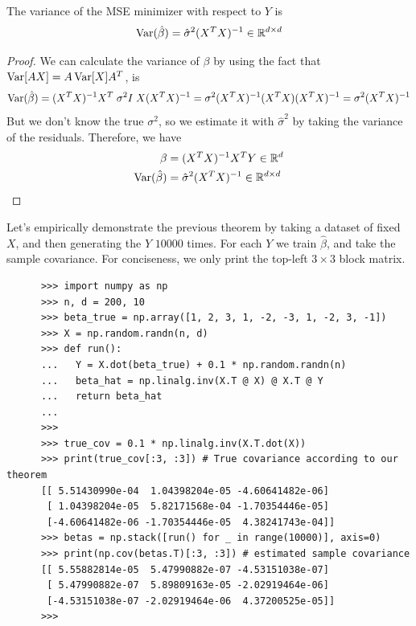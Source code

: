   \begin{corollary}
    The variance of the MSE minimizer with respect to $Y$ is 
    \begin{equation}
      \Var(\hat{\beta}) = \hat{\sigma}^2 (X^T X)^{-1} \in \mathbb{R}^{d \times d}
    \end{equation}
  \end{corollary}
  \begin{proof}
    We can calculate the variance of $\beta$ by using the fact that $\Var[A X] = A \Var[X] A^T$, is
    \begin{equation}
      \Var(\hat{\beta}) = (X^{T} X)^{-1} X^{T} \;\sigma^2 I \; X  (X^{T} X)^{-1} = \sigma^2 (X^{T} X)^{-1} (X^{T} X)  (X^{T} X)^{-1} = \sigma^2  (X^{T} X)^{-1}
    \end{equation}
    But we don't know the true $\sigma^2$, so we estimate it with $\hat{\sigma}^2$ by taking the variance of the residuals. Therefore, we have 
    \begin{align}
      \beta & = (X^T X)^{-1} X^T Y \in \mathbb{R}^d \\
      \Var(\hat{\beta}) & = \hat{\sigma}^2 (X^T X)^{-1} \in \mathbb{R}^{d \times d}
    \end{align}
  \end{proof}

  \begin{example}[Simulation]
    Let's empirically demonstrate the previous theorem by taking a dataset of fixed $X$, and then generating the $Y$ $10000$ times. For each $Y$ we train $\hat{\beta}$, and take the sample covariance. For conciseness, we only print the top-left $3 \times 3$ block matrix. 

    \begin{lstlisting}
      >>> import numpy as np 
      >>> n, d = 200, 10
      >>> beta_true = np.array([1, 2, 3, 1, -2, -3, 1, -2, 3, -1])
      >>> X = np.random.randn(n, d)
      >>> def run(): 
      ...   Y = X.dot(beta_true) + 0.1 * np.random.randn(n)
      ...   beta_hat = np.linalg.inv(X.T @ X) @ X.T @ Y 
      ...   return beta_hat
      ... 
      >>> 
      >>> true_cov = 0.1 * np.linalg.inv(X.T.dot(X)) 
      >>> print(true_cov[:3, :3]) # True covariance according to our theorem
      [[ 5.51430990e-04  1.04398204e-05 -4.60641482e-06]
       [ 1.04398204e-05  5.82171568e-04 -1.70354446e-05]
       [-4.60641482e-06 -1.70354446e-05  4.38241743e-04]]
      >>> betas = np.stack([run() for _ in range(10000)], axis=0)
      >>> print(np.cov(betas.T)[:3, :3]) # estimated sample covariance
      [[ 5.55882814e-05  5.47990882e-07 -4.53151038e-07]
       [ 5.47990882e-07  5.89809163e-05 -2.02919464e-06]
       [-4.53151038e-07 -2.02919464e-06  4.37200525e-05]]
      >>> 
    \end{lstlisting}
  \end{example}

